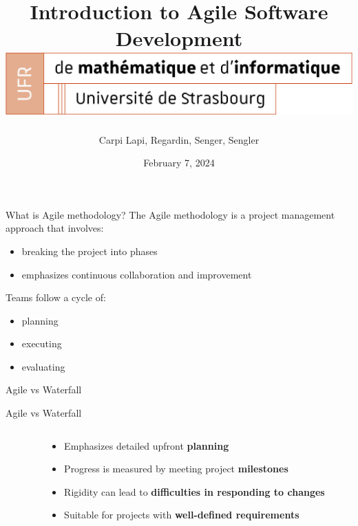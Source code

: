 \documentclass[10pt]{beamer}
\title[Introduction to Agile Software Development]{
  Introduction to Agile Software Development \\
  \vspace{1cm}
    \includegraphics[width=0.6\pdfpagewidth]{images/logo_Uni.png}}
\author[SuperAgile]{Carpi Lapi, Regardin, Senger, Sengler}
\date[February 7, 2024]{February 7, 2024}
\begin{document}
\frame{\titlepage}

\begin{frame}{What is Agile methodology?}
The Agile methodology is a project management approach that involves:
\begin{itemize}
    \item breaking the project into phases
    \item emphasizes continuous collaboration and improvement \\
    \vspace{1cm}
\end{itemize}

Teams follow a cycle of: 
\begin{itemize}
    \item planning
    \item executing
    \item evaluating
\end{itemize}

\end{frame}

\begin{frame}{Agile vs Waterfall}
  \vspace{0.5cm}
\end{frame}

\begin{frame}{Agile vs Waterfall}
  \vspace{0.5cm}
  \begin{columns}[T]
    \begin{column}{0.5\textwidth}
    \end{column}

    \begin{column}{0.5\textwidth}
      \vspace{2cm}
      \begin{itemize}
        \item<2-> Emphasizes detailed upfront \textbf{planning}
        \item<3-> Progress is measured by meeting project \textbf{milestones}
        \item<4-> Rigidity can lead to \textbf{difficulties in responding to changes}
        \item<5-> Suitable for projects with \textbf{well-defined requirements}
      \end{itemize}
    \end{column}
  \end{columns}
\end{frame}
\end{document}
